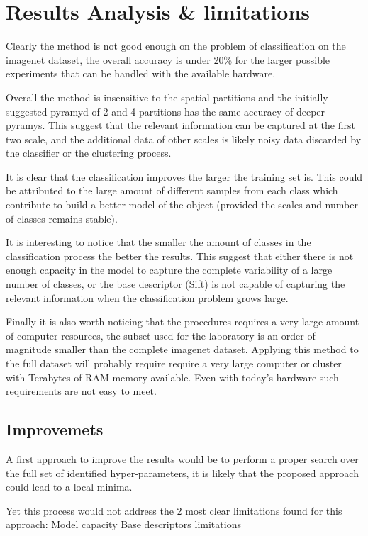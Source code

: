 \documentclass[10pt,twocolumn,letterpaper]{article}
\begin{document}
\section{Results Analysis \& limitations}

Clearly the method is not good enough on the problem of classification on the imagenet dataset, the overall accuracy is under 20\% for the larger possible experiments  that can be handled with the available hardware.

Overall the method is insensitive to the spatial partitions and the initially suggested pyramyd of 2 and 4 partitions has the same accuracy of deeper pyramys. This suggest that the relevant information can be captured at the first two scale, and the additional data of other scales is likely noisy data discarded by the classifier or the clustering process.

It is clear that the classification improves the larger the training set is. This could be attributed to the large amount of different samples from each class which contribute to build a better model of the object (provided the scales and number of classes remains stable).

It is interesting to notice that the smaller the amount of classes in the classification process the better the results. This suggest that either there is not enough capacity in the model to capture the complete variability of a large number of classes, or the base descriptor (Sift) is not capable of capturing the relevant information when the classification problem grows large.

Finally it is also worth noticing that the procedures requires a very large amount of computer resources, the subset used for the laboratory is an order of magnitude smaller than the complete imagenet dataset. Applying this method to the full dataset will probably require require a very large computer or cluster with Terabytes of RAM memory available. Even with today's hardware such requirements are not easy to meet.

\subsection{Improvemets}
A first approach to improve the results would be to perform a proper search over the full set of identified hyper-parameters, it is likely that the proposed approach could lead to a local minima.

Yet this process would not address the 2 most clear limitations found for this approach: Model capacity Base descriptors limitations
\end{document}
